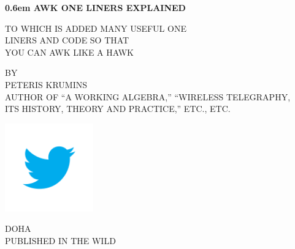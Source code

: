 \documentclass{book}
\begin{document}
\clearpage
\newcommand\nbvspace[1][3]{\vspace*{\stretch{#1}}}
\newcommand\nbstretchyspace{\spaceskip0.5em plus 0.25em minus 0.25em}
\newcommand{\nbtitlestretch}{\spaceskip0.6em}
\pagestyle{empty}
\begin{center}
\bfseries
\nbvspace[1]
\Huge
{\nbtitlestretch\huge
AWK ONE LINERS EXPLAINED}
\nbvspace[1]

\normalsize
TO WHICH IS ADDED MANY USEFUL ONE\\
LINERS AND CODE SO THAT\\
YOU CAN AWK LIKE A HAWK
\nbvspace[1]

\small BY\\
\Large PETERIS KRUMINS\\[0.5em]
\footnotesize AUTHOR OF ``A WORKING ALGEBRA,'' ``WIRELESS TELEGRAPHY,\\
ITS HISTORY, THEORY AND PRACTICE,'' ETC., ETC.

\nbvspace[2]
\includegraphics[width=1.5in]{logo}
\nbvspace[3]


\normalsize
DOHA\\
\large
PUBLISHED IN THE WILD
\nbvspace[1]
\end{center}
\end{document}
